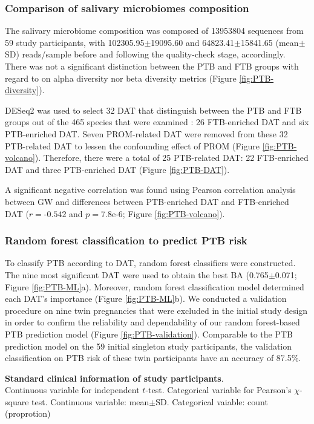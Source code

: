 \documentclass[11pt, a4paper, onecolumn, oneside]{report}
\begin{document}
            \subsubsection{Comparison of salivary microbiomes composition}
                The salivary microbiome composition was composed of 13953804 sequences from 59 study participants, with 102305.95$\pm$19095.60 and 64823.41$\pm$15841.65 (mean$\pm$SD) reads/sample before and following the quality-check stage, accordingly. There was not a significant distinction between the PTB and FTB groups with regard to on alpha diversity nor beta diversity metrics (Figure \ref{fig:PTB-diversity}).

                DESeq2 was used to select 32 DAT that distinguish between the PTB and FTB groups out of the 465 species that were examined \cite{DESeq2-1}: 26 FTB-enriched DAT and six PTB-enriched DAT. Seven PROM-related DAT were removed from these 32 PTB-related DAT to lessen the confounding effect of PROM (Figure \ref{fig:PTB-volcano}). Therefore, there were a total of 25 PTB-related DAT: 22 FTB-enriched DAT and three PTB-enriched DAT (Figure \ref{fig:PTB-DAT}).

                A significant negative correlation was found using Pearson correlation analysis between GW and differences between PTB-enriched DAT and FTB-enriched DAT ($r = \textrm{-}0.542$ and $p = 7.8\textrm{e-}6$; Figure \ref{fig:PTB-volcano}).

            \subsubsection{Random forest classification to predict PTB risk}
                To classify PTB according to DAT, random forest classifiers were constructed. The nine most significant DAT were used to obtain the best BA (0.765$\pm$0.071; Figure \ref{fig:PTB-ML}a). Moreover, random forest classification model determined each DAT's importance (Figure \ref{fig:PTB-ML}b). We conducted a validation procedure on nine twin pregnancies that were excluded in the initial study design in order to confirm the reliability and dependability of our random forest-based PTB prediction model (Figure \ref{fig:PTB-validation}). Comparable to the PTB prediction model on the 59 initial singleton study participants, the validation classification on PTB risk of these twin participants have an accuracy of 87.5\%.

            \begin{table}[p]
                \centering
                \caption[Standard clinical information of study participants]{\textbf{Standard clinical information of study participants}. \\
                    Continuous variable for independent $t$-test. Categorical variable for Pearson's $\chi$-square test. Continuous variable: mean$\pm$SD. Categorical vaiable: count (proprotion)}
                    
                \label{tab:PTB-clinical}
            \end{table}
            \clearpage
\end{document}
